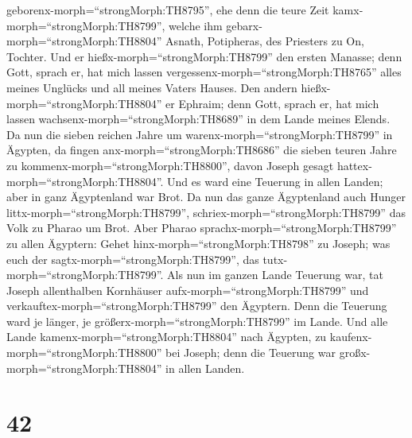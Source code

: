 geborenx-morph=``strongMorph:TH8795'', ehe denn die teure Zeit
kamx-morph=``strongMorph:TH8799'', welche ihm
gebarx-morph=``strongMorph:TH8804'' Asnath, Potipheras, des Priesters zu
On, Tochter.  Und er hießx-morph=``strongMorph:TH8799'' den
ersten Manasse; denn Gott, sprach er, hat mich lassen
vergessenx-morph=``strongMorph:TH8765'' alles meines Unglücks und all
meines Vaters Hauses.  Den andern
hießx-morph=``strongMorph:TH8804'' er Ephraim; denn Gott, sprach er, hat
mich lassen wachsenx-morph=``strongMorph:TH8689'' in dem Lande meines
Elends.  Da nun die sieben reichen Jahre um
warenx-morph=``strongMorph:TH8799'' in Ägypten,  da fingen
anx-morph=``strongMorph:TH8686'' die sieben teuren Jahre zu
kommenx-morph=``strongMorph:TH8800'', davon Joseph gesagt
hattex-morph=``strongMorph:TH8804''. Und es ward eine Teuerung in allen
Landen; aber in ganz Ägyptenland war Brot.  Da nun das
ganze Ägyptenland auch Hunger littx-morph=``strongMorph:TH8799'',
schriex-morph=``strongMorph:TH8799'' das Volk zu Pharao um Brot. Aber
Pharao sprachx-morph=``strongMorph:TH8799'' zu allen Ägyptern: Gehet
hinx-morph=``strongMorph:TH8798'' zu Joseph; was euch der
sagtx-morph=``strongMorph:TH8799'', das
tutx-morph=``strongMorph:TH8799''.  Als nun im ganzen Lande
Teuerung war, tat Joseph allenthalben Kornhäuser
aufx-morph=``strongMorph:TH8799'' und
verkauftex-morph=``strongMorph:TH8799'' den Ägyptern. Denn die Teuerung
ward je länger, je größerx-morph=``strongMorph:TH8799'' im Lande.
 Und alle Lande kamenx-morph=``strongMorph:TH8804'' nach
Ägypten, zu kaufenx-morph=``strongMorph:TH8800'' bei Joseph; denn die
Teuerung war großx-morph=``strongMorph:TH8804'' in allen Landen.

\hypertarget{section-41}{%
\section{42}\label{section-41}}

